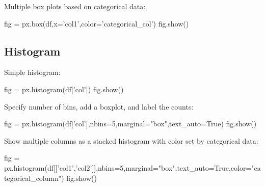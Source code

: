 Multiple box plots based on categorical data:

\begin{pycode}
    fig = px.box(df,x='col1',color='categorical_col')
    fig.show()
\end{pycode}

\subsection{Histogram}

Simple histogram:

\begin{pycode}
    fig = px.histogram(df['col'])
    fig.show()
\end{pycode}

Specify number of bins, add a boxplot, and label the counts:

\begin{pycode}
    fig = px.histogram(df['col'],nbins=5,marginal="box",text_auto=True)
    fig.show()
\end{pycode}

Show multiple columns as a stacked histogram with color set by categorical data:

\begin{pycode}
    fig = px.histogram(df[['col1','col2']],nbins=5,marginal="box",text_auto=True,color="categorical_column")
    fig.show()
\end{pycode}
